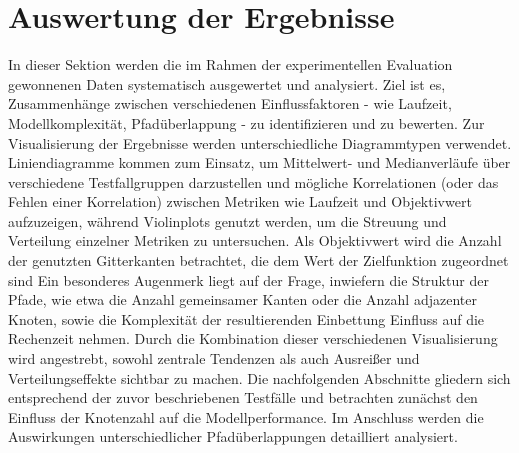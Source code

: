 \documentclass[bachelor, german]{algothesis}
\begin{document}
\section{Auswertung der Ergebnisse}
In dieser Sektion werden die im Rahmen der experimentellen Evaluation gewonnenen Daten systematisch ausgewertet und analysiert. Ziel ist es, Zusammenhänge zwischen verschiedenen Einflussfaktoren - wie Laufzeit, Modellkomplexität, Pfadüberlappung - zu identifizieren und zu bewerten.  Zur Visualisierung der Ergebnisse werden unterschiedliche Diagrammtypen verwendet. Liniendiagramme kommen zum Einsatz, um Mittelwert- und Medianverläufe über verschiedene Testfallgruppen darzustellen und mögliche Korrelationen (oder das Fehlen einer Korrelation) zwischen Metriken wie Laufzeit und Objektivwert aufzuzeigen, während Violinplots genutzt werden, um die Streuung und Verteilung einzelner Metriken zu untersuchen. Als Objektivwert wird die Anzahl der genutzten Gitterkanten betrachtet, die dem Wert der Zielfunktion zugeordnet sind\newline
Ein besonderes Augenmerk liegt auf der Frage, inwiefern die Struktur der Pfade, wie etwa die Anzahl gemeinsamer Kanten oder die Anzahl adjazenter Knoten, sowie die Komplexität der resultierenden Einbettung Einfluss auf die Rechenzeit nehmen. Durch die Kombination dieser verschiedenen Visualisierung wird angestrebt, sowohl zentrale Tendenzen als auch Ausreißer und Verteilungseffekte sichtbar zu machen.\newline
Die nachfolgenden Abschnitte gliedern sich entsprechend der zuvor beschriebenen Testfälle
und betrachten zunächst den Einfluss  der Knotenzahl auf die Modellperformance. Im Anschluss werden die Auswirkungen unterschiedlicher Pfadüberlappungen detailliert analysiert.\newline
\end{document}
